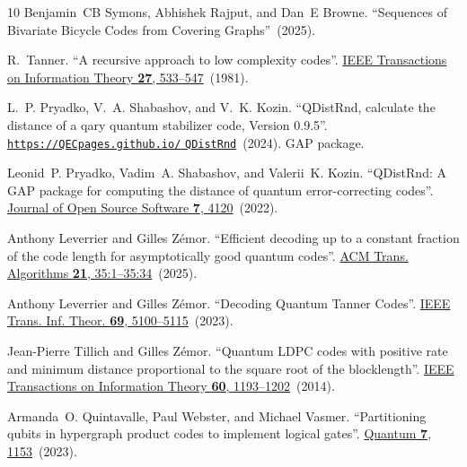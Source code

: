 \documentclass[a4paper,onecolumn,11pt]{quantumarticle}
\begin{document}
\begin{thebibliography}{10}
Benjamin~CB Symons, Abhishek Rajput, and Dan~E Browne.
\newblock ``{Sequences of Bivariate Bicycle Codes from Covering
  Graphs}''~(2025).

R.~Tanner.
\newblock ``A recursive approach to low complexity codes''.
\newblock \href{https://dx.doi.org/10.1109/TIT.1981.1056404}{IEEE Transactions
  on Information Theory {\bf 27}, 533--547}~(1981).

L.~P. Pryadko, V.~A. Shabashov, and V.~K. Kozin.
\newblock ``{QDistRnd}, calculate the distance of a q\texttt{}ary
  quantum stabilizer code, {V}ersion 0.9.5''.
\newblock \href {https://QEC-pages.github.io/QDistRnd}
  {\texttt{https://QEC\texttt{}pages.github.io/}\discretionary
  {}{}{}\texttt{QDistRnd}}~(2024).
\newblock GAP package.

Leonid~P. Pryadko, Vadim~A. Shabashov, and Valerii~K. Kozin.
\newblock ``{QDistRnd: A GAP package for computing the distance of quantum
  error-correcting codes}''.
\newblock \href{https://dx.doi.org/10.21105/joss.04120}{Journal of Open Source
  Software {\bf 7}, 4120}~(2022).

Anthony Leverrier and Gilles Z{\'{e}}mor.
\newblock ``Efficient decoding up to a constant fraction of the code length for
  asymptotically good quantum codes''.
\newblock \href{https://dx.doi.org/10.1145/3663763}{{ACM} Trans. Algorithms
  {\bf 21}, 35:1--35:34}~(2025).

Anthony Leverrier and Gilles Z\'{e}mor.
\newblock ``{Decoding Quantum Tanner Codes}''.
\newblock \href{https://dx.doi.org/10.1109/TIT.2023.3267945}{IEEE Trans. Inf.
  Theor. {\bf 69}, 5100–5115}~(2023).

Jean-Pierre Tillich and Gilles Zémor.
\newblock ``{Quantum LDPC codes with positive rate and minimum distance
  proportional to the square root of the blocklength}''.
\newblock \href{https://dx.doi.org/10.1109/TIT.2013.2292061}{IEEE Transactions
  on Information Theory {\bf 60}, 1193--1202}~(2014).

Armanda~O. Quintavalle, Paul Webster, and Michael Vasmer.
\newblock ``Partitioning qubits in hypergraph product codes to implement
  logical gates''.
\newblock \href{https://dx.doi.org/10.22331/q-2023-10-24-1153}{{Quantum} {\bf
  7}, 1153}~(2023).

\end{thebibliography}


\appendix
\end{document}
